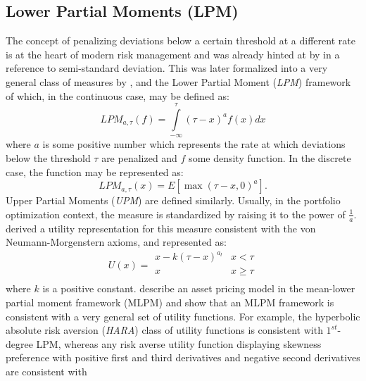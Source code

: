 \subsection{Lower Partial Moments (LPM)}\label{LPM}
The concept of penalizing deviations below a certain threshold at a different
rate is at the heart of modern risk management and was already hinted at by
 in a reference to semi-standard deviation. This
was later formalized into a very general class of measures by
, and the Lower Partial Moment (\emph{LPM}) framework
of  which, in the continuous case, may be defined
as:
\begin{equation}
LP{M_{a ,\tau }}\left( f \right)=\int\limits_{ - \infty }^\tau  {{{\left( {\tau  - x} \right)}^a }f\left( x \right)dx}
\end{equation}
where $a$ is some positive number which represents the rate at which deviations
below the threshold $\tau$ are penalized and $f$ some density function.
In the discrete case, the function may be represented as:
\begin{equation}
LP{M_{a ,\tau }}\left( x \right)=E\left[ {\max {{\left( {\tau  - x,0} \right)}^a}} \right].
\end{equation}
Upper Partial Moments (\emph{UPM}) are defined similarly. Usually, in the
portfolio optimization context, the measure is standardized by raising it to
the power of $\frac{1}{a}$.  derived a utility
representation for this measure consistent with the von Neumann-Morgenstern
axioms, and represented as:
\begin{equation}\label{eq:lpmutility}
U\left( x \right)=\begin{array}{*{20}{c}}
   {x - {k}{{\left( {\tau  - x} \right)}^{{a_l}}}} & {x < \tau }  \\
   x & {x \geq \tau }  \\
\end{array}
\end{equation}
where $k$ is a positive constant.  describe an asset
pricing model in the mean-lower partial moment framework (MLPM) and show that
an MLPM framework is consistent with a very general set of utility functions.
For example, the hyperbolic absolute risk aversion (\emph{HARA}) class of
utility functions  is consistent with $1^{st}$-degree LPM, whereas any risk
averse utility function displaying skewness preference with positive first
and third derivatives and negative second derivatives are consistent with
